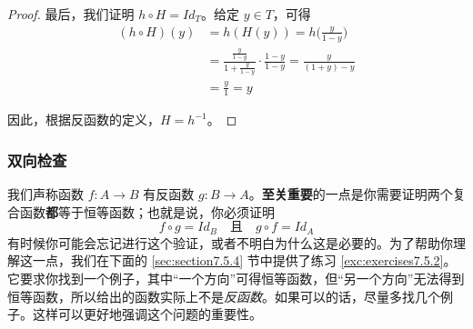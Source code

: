\begin{example}
\begin{proof}
        最后，我们证明 $h \circ H = Id_T$。给定 $y \in T$，可得
        \begin{align*}
            (h \circ H)(y) &= h(H(y)) = h\Big(\frac{y}{1-y}\Big) \\
            &=\frac{\frac{y}{1-y}}{1+\frac{y}{1-y}} \cdot \frac{1-y}{1-y} = \frac{y}{(1+y)-y} \\
            &=\frac{y}{1} = y
        \end{align*}

        因此，根据反函数的定义，$H = h^{-1}$。
    \end{proof}
\end{example}

\subsubsection*{双向检查}

我们声称函数 $f: A \to B$ 有反函数 $g: B \to A$。\textbf{至关重要}的一点是你需要证明两个复合函数\textbf{都}等于恒等函数；也就是说，你必须证明
\[f \circ g = Id_B \quad \text{且} \quad g \circ f = Id_A\]
有时候你可能会忘记进行这个验证，或者不明白为什么这是必要的。为了帮助你理解这一点，我们在下面的 \ref{sec:section7.5.4} 节中提供了练习 \ref{exc:exercises7.5.2}。它要求你找到一个例子，其中``一个方向''可得恒等函数，但``另一个方向''无法得到恒等函数，所以给出的函数实际上不是\emph{反函数}。如果可以的话，尽量多找几个例子。这样可以更好地强调这个问题的重要性。